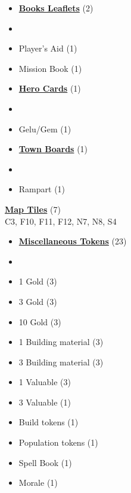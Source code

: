 

\begin{multicols*}{3}

\footnotesize

\begin{itemize}[leftmargin=0pt, label={}, noitemsep, noitemsep]
  \item \textbf{\normalsize{\underline{Books Leaflets}}} (2)
  \item
  \item Player's Aid (1)
  \item Mission Book (1)
\end{itemize}

\begin{itemize}[leftmargin=0pt, label={}, noitemsep, noitemsep]
  \item \textbf{\normalsize{\underline{Hero Cards}}} (1)
  \item
  \item Gelu/Gem (1)
\end{itemize}

\begin{itemize}[leftmargin=0pt, label={}, noitemsep, noitemsep]
  \item \textbf{\normalsize{\underline{Town Boards}}} (1)
  \item
  \item Rampart (1)
\end{itemize}

\textbf{\normalsize{\underline{Map Tiles}}} (7)\\

C3, F10, F11, F12, N7, N8, S4

\begin{itemize}[leftmargin=0pt, label={}, noitemsep, noitemsep]
  \item \textbf{\normalsize{\underline{Miscellaneous Tokens}}} (23)
  \item
  \item 1 Gold (3)
  \item 3 Gold (3)
  \item 10 Gold (3)
  \item 1 Building material (3)
  \item 3 Building material (3)
  \item 1 Valuable (3)
  \item 3 Valuable (1)
  \item Build tokens (1)
  \item Population tokens (1)
  \item Spell Book (1)
  \item Morale (1)
\end{itemize}


\end{multicols*}
